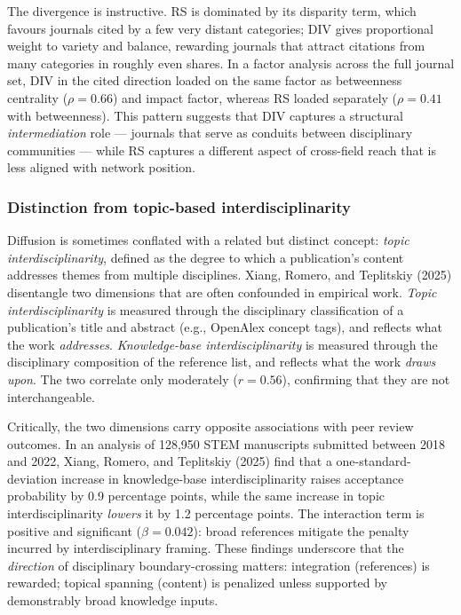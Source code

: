 \documentclass[
]{article}
\begin{document}
The divergence is instructive. RS is dominated by its disparity term,
which favours journals cited by a few very distant categories; DIV gives
proportional weight to variety and balance, rewarding journals that
attract citations from many categories in roughly even shares. In a
factor analysis across the full journal set, DIV in the cited direction
loaded on the same factor as betweenness centrality (\(\rho = 0.66\))
and impact factor, whereas RS loaded separately (\(\rho = 0.41\) with
betweenness). This pattern suggests that DIV captures a structural
\emph{intermediation} role --- journals that serve as conduits between
disciplinary communities --- while RS captures a different aspect of
cross-field reach that is less aligned with network position.

\hypertarget{distinction-from-topic-based-interdisciplinarity}{%
\subsubsection{Distinction from topic-based
interdisciplinarity}\label{distinction-from-topic-based-interdisciplinarity}}

Diffusion is sometimes conflated with a related but distinct concept:
\emph{topic interdisciplinarity}, defined as the degree to which a
publication's content addresses themes from multiple disciplines. Xiang,
Romero, and Teplitskiy (2025) disentangle two dimensions that are often
confounded in empirical work. \emph{Topic interdisciplinarity} is
measured through the disciplinary classification of a publication's
title and abstract (e.g., OpenAlex concept tags), and reflects what the
work \emph{addresses}. \emph{Knowledge-base interdisciplinarity} is
measured through the disciplinary composition of the reference list, and
reflects what the work \emph{draws upon}. The two correlate only
moderately (\(r = 0.56\)), confirming that they are not interchangeable.

Critically, the two dimensions carry opposite associations with peer
review outcomes. In an analysis of 128,950 STEM manuscripts submitted
between 2018 and 2022, Xiang, Romero, and Teplitskiy (2025) find that a
one-standard-deviation increase in knowledge-base interdisciplinarity
raises acceptance probability by 0.9 percentage points, while the same
increase in topic interdisciplinarity \emph{lowers} it by 1.2 percentage
points. The interaction term is positive and significant
(\(\beta = 0.042\)): broad references mitigate the penalty incurred by
interdisciplinary framing. These findings underscore that the
\emph{direction} of disciplinary boundary-crossing matters: integration
(references) is rewarded; topical spanning (content) is penalized unless
supported by demonstrably broad knowledge inputs.
\end{document}
